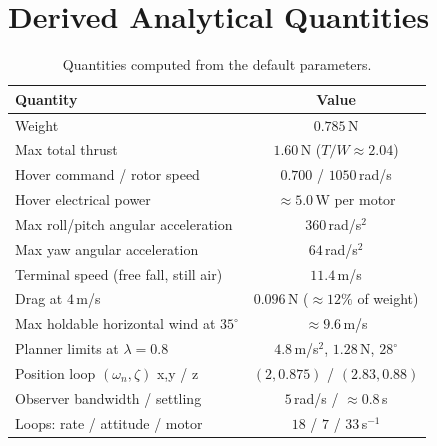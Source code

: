 \documentclass[11pt,a4paper]{article}
\begin{document}
\section{Derived Analytical Quantities}
\begin{table}[h]
\centering\small
\begin{tabular}{@{}lc@{}}
\toprule
Quantity & Value \\ \midrule
Weight & $0.785$\,N \\
Max total thrust & $1.60$\,N ($T/W\approx2.04$) \\
Hover command / rotor speed & $0.700$ / $1050$\,rad/s \\
Hover electrical power & $\approx5.0$\,W per motor \\
Max roll/pitch angular acceleration & $360$\,rad/s$^2$ \\
Max yaw angular acceleration & $64$\,rad/s$^2$ \\
Terminal speed (free fall, still air) & $11.4$\,m/s \\
Drag at $4$\,m/s & $0.096$\,N ($\approx12\%$ of weight) \\
Max holdable horizontal wind at $35^\circ$ & $\approx9.6$\,m/s \\
Planner limits at $\lambda=0.8$ & $4.8$\,m/s$^2$, $1.28$\,N, $28^\circ$ \\
Position loop $(\omega_n,\zeta)$ x,y / z & $(2,0.875)$ / $(2.83,0.88)$ \\
Observer bandwidth / settling & $5$\,rad/s / $\approx0.8$\,s \\
Loops: rate / attitude / motor & $18$ / $7$ / $33$\,s$^{-1}$ \\
\bottomrule
\end{tabular}
\caption{Quantities computed from the default parameters.}
\end{table}

\end{document}
